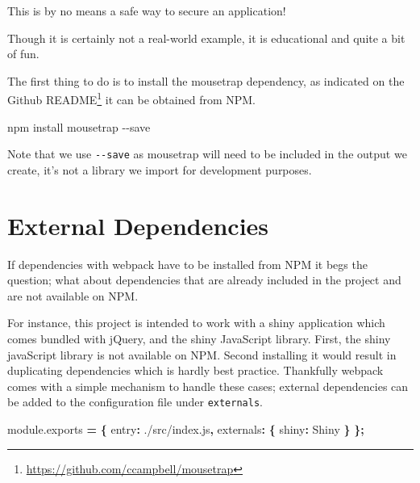 \documentclass[
  10pt,
]{krantz}
\makeatletter
\newenvironment{Shaded}{\begin{snugshade}}{\end{snugshade}}
\newcommand{\AttributeTok}[1]{\textcolor[rgb]{0.61,0.61,0.61}{#1}}
\newcommand{\DataTypeTok}[1]{\textcolor[rgb]{0.27,0.27,0.27}{#1}}
\newcommand{\ExtensionTok}[1]{#1}
\newcommand{\NormalTok}[1]{#1}
\newcommand{\OperatorTok}[1]{\textcolor[rgb]{0.43,0.43,0.43}{\textbf{#1}}}
\newcommand{\StringTok}[1]{\textcolor[rgb]{0.5,0.5,0.5}{#1}}
\newcommand{\VariableTok}[1]{\textcolor[rgb]{0,0,0}{#1}}
\renewcommand{\href}[2]{#2\footnote{\url{#1}}}
\newenvironment{kframe}{%
\medskip{}
\setlength{\fboxsep}{.8em}
 \def\at@end@of@kframe{}%
 \ifinner\ifhmode%
  \def\at@end@of@kframe{\end{minipage}}%
  \begin{minipage}{\columnwidth}%
 \fi\fi%
 \def\FrameCommand##1{\hskip\@totalleftmargin \hskip-\fboxsep
 \colorbox{shadecolor}{##1}\hskip-\fboxsep
     \hskip-\linewidth \hskip-\@totalleftmargin \hskip\columnwidth}%
 \MakeFramed {\advance\hsize-\width
   \@totalleftmargin\z@ \linewidth\hsize
   \@setminipage}}%
 {\par\unskip\endMakeFramed%
 \at@end@of@kframe}
\renewenvironment{Shaded}{\begin{kframe}}{\end{kframe}}
\newenvironment{rmdblock}[1]
  {
  \begin{itemize}
  \renewcommand{\labelitemi}{
    \raisebox{-.7\height}[0pt][0pt]{
      {\setkeys{Gin}{width=3em,keepaspectratio}\texttt{[image: images/\#1]}}
    }
  }
  \setlength{\fboxsep}{1em}
  \begin{kframe}
  \item
  }
  {
  \end{kframe}
  \end{itemize}
  }
\newenvironment{rmdnote}
  {\begin{rmdblock}{note}}
  {\end{rmdblock}}
\makeatother
\begin{document}
\begin{rmdnote}
This is by no means a safe way to secure an application!
\end{rmdnote}

Though it is certainly not a real-world example, it is educational and quite a bit of fun.

The first thing to do is to install the mousetrap dependency, as indicated on the \href{https://github.com/ccampbell/mousetrap}{Github README} it can be obtained from NPM.

\begin{Shaded}
\begin{Highlighting}[]
\ExtensionTok{npm}\NormalTok{ install mousetrap {-}{-}save}
\end{Highlighting}
\end{Shaded}

Note that we use \texttt{-\/-save} as mousetrap will need to be included in the output we create, it's not a library we import for development purposes.

\hypertarget{webpack-intro-external-dependencies}{%
\section{External Dependencies}\label{webpack-intro-external-dependencies}}

If dependencies with webpack have to be installed from NPM it begs the question; what about dependencies that are already included in the project and are not available on NPM.

For instance, this project is intended to work with a shiny application which comes bundled with jQuery, and the shiny JavaScript library. First, the shiny javaScript library is not available on NPM. Second installing it would result in duplicating dependencies which is hardly best practice. Thankfully webpack comes with a simple mechanism to handle these cases; external dependencies can be added to the configuration file under \texttt{externals}.

\begin{Shaded}
\begin{Highlighting}[]
\VariableTok{module}\NormalTok{.}\AttributeTok{exports} \OperatorTok{=} \OperatorTok{\{}
  \DataTypeTok{entry}\OperatorTok{:} \StringTok{\textquotesingle{}./src/index.js\textquotesingle{}}\OperatorTok{,}
  \DataTypeTok{externals}\OperatorTok{:} \OperatorTok{\{}
    \DataTypeTok{shiny}\OperatorTok{:} \StringTok{\textquotesingle{}Shiny\textquotesingle{}}
  \OperatorTok{\}}
\OperatorTok{\};}
\end{Highlighting}
\end{Shaded}
\end{document}
